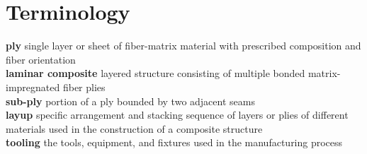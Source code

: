 \section{Terminology}

\textbf{ply} single layer or sheet of fiber-matrix material with prescribed composition and fiber orientation \\
\textbf{laminar composite} layered structure consisting of multiple bonded matrix-impregnated fiber plies \\
\textbf{sub-ply} portion of a ply bounded by two adjacent seams \\
\textbf{layup} specific arrangement and stacking sequence of layers or plies of different materials used in the construction of a composite structure \\
\textbf{tooling} the tools, equipment, and fixtures used in the manufacturing process
